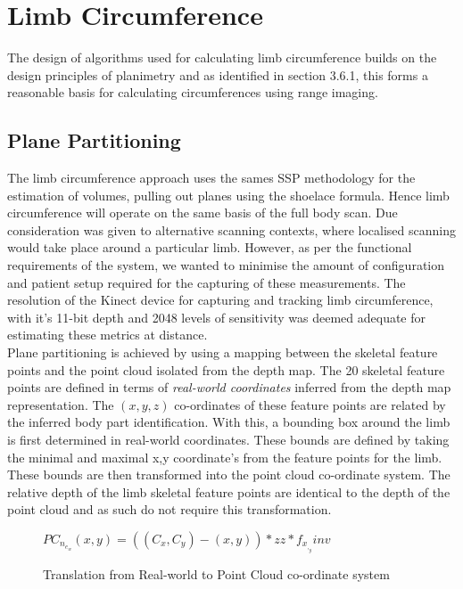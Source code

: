 \section{Limb Circumference}
\label{design:limbcircum}

The design of algorithms used for calculating limb circumference builds on the design principles of planimetry and as identified in section 3.6.1, this forms a reasonable basis for calculating circumferences using range imaging. 

\subsection{Plane Partitioning}

The limb circumference approach uses the sames SSP methodology for the estimation of volumes, pulling out planes using the shoelace formula. Hence limb circumference will operate on the same basis of the full body scan. Due consideration was given to alternative scanning contexts, where localised scanning would take place around a particular limb. However, as per the functional requirements of the system, we wanted to minimise the amount of configuration and patient setup required for the capturing of these measurements. The resolution of the Kinect device for capturing and tracking limb circumference, with it's 11-bit depth and 2048 levels of sensitivity was deemed adequate for estimating these metrics at distance. \\

Plane partitioning is achieved by using a mapping between the skeletal feature points and the point cloud isolated from the depth map. The 20 skeletal feature points are defined in terms of \emph{real-world coordinates} inferred from the depth map representation. The $(x,y,z)$ co-ordinates of these feature points are related by the inferred body part identification. With this, a bounding box around the limb is first determined in real-world coordinates. These bounds are defined by taking the minimal and maximal x,y coordinate's from the feature points for the limb. These bounds are then transformed into the point cloud co-ordinate system. The relative depth of the limb skeletal feature points are identical to the depth of the point cloud and as such do not require this transformation. \\

\begin{figure}[ht]
\begin{center}
$PC_n_e_w(x,y) = ((C_x,C_y) - (x,y)) * zz * f_x_,_yinv$
\end{center}
\caption{Translation from Real-world to Point Cloud co-ordinate system}
\label{fig:conversionformula}
\end{figure}


